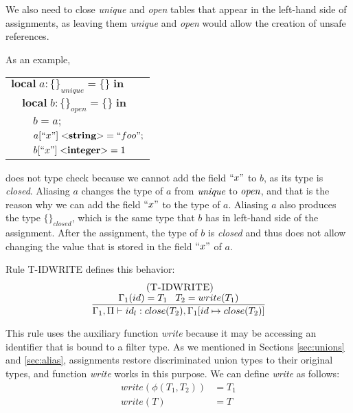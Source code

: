 We also need to close \emph{unique} and \emph{open} tables that
appear in the left-hand side of assignments, as leaving them
\emph{unique} and \emph{open} would allow the creation of
unsafe references.

As an example,
\begin{center}
\begin{tabular}{lll}
\multicolumn{3}{l}{$\mathbf{local} \; a:\{\}_{unique} = \{\} \; \mathbf{in}$}\\
& \multicolumn{2}{l}{$\mathbf{local} \; b:\{\}_{open} = \{\} \; \mathbf{in}$}\\
& & \multicolumn{1}{l}{$b = a;$}\\
& & \multicolumn{1}{l}{$a[``x"] \; {<}\mathbf{string}{>} = ``foo";$}\\
& & \multicolumn{1}{l}{$b[``x"] \; {<}\mathbf{integer}{>} = 1$}\\
\end{tabular}
\end{center}
does not type check because we cannot add the field $``x"$ to $b$,
as its type is \emph{closed}.
Aliasing $a$ changes the type of $a$ from $\emph{unique}$ to
$\emph{open}$, and that is the reason why we can add the field
$``x"$ to the type of $a$.
Aliasing $a$ also produces the type $\{\}_{closed}$, which is
the same type that $b$ has in left-hand side of the assignment.
After the assignment, the type of $b$ is \emph{closed} and thus
does not allow changing the value that is stored in the field
$``x"$ of $a$.

Rule \textsc{T-IDWRITE} defines this behavior:
\[
\begin{array}{c}
\; (\textsc{T-IDWRITE})\\
\dfrac{\Gamma_{1}(id) = T_{1} \;\;\; T_{2} = write(T_{1})}
      {\Gamma_{1}, \Pi \vdash id_{l}:close(T_{2}), \Gamma_{1}[id \mapsto close(T_{2})]}
\end{array}
\]

This rule uses the auxiliary function \emph{write} because it may be
accessing an identifier that is bound to a filter type.
As we mentioned in Sections \ref{sec:unions} and \ref{sec:alias},
assignments restore discriminated union types to their original types,
and function \emph{write} works in this purpose.
We can define \emph{write} as follows:
\begin{align*}
write(\phi(T_{1},T_{2})) & = T_{1}\\
write(T) & = T
\end{align*}


